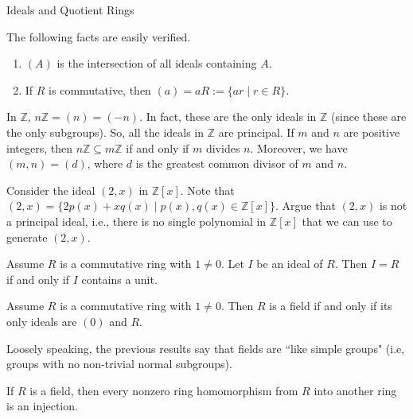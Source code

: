 \begin{section}{Ideals and Quotient Rings}
\begin{remark}
The following facts are easily verified.
\begin{enumerate}[label=\textrm{(\alph*)}]
\item $(A)$ is the intersection of all ideals containing $A$.
\item If $R$ is commutative, then $(a)=aR:=\{ar\mid r\in R\}$.
\end{enumerate}
\end{remark}

\begin{example}\label{ex:PrincipalIdeals}
In $\mathbb{Z}$, $n\mathbb{Z}=(n)=(-n)$.  In fact, these are the only ideals in $\mathbb{Z}$ (since these are the only subgroups). So, all the ideals in $\mathbb{Z}$ are principal. If $m$ and $n$ are positive integers, then $n\mathbb{Z}\subseteq m\mathbb{Z}$ if and only if $m$ divides $n$.  Moreover, we have $(m,n)=(d)$, where $d$ is the greatest common divisor of $m$ and $n$.
\end{example}

\begin{problem}
Consider the ideal $(2,x)$ in $\mathbb{Z}[x]$. Note that $(2,x)=\{2p(x)+xq(x)\mid p(x),q(x)\in\mathbb{Z}[x]\}$.  Argue that $(2,x)$ is not a principal ideal, i.e., there is no single polynomial in $\mathbb{Z}[x]$ that we can use to generate $(2,x)$.
\end{problem}

\begin{theorem}
Assume $R$ is a commutative ring with $1\neq 0$. Let $I$ be an ideal of $R$. Then $I=R$ if and only if $I$ contains a unit.
\end{theorem}

\begin{theorem}
Assume $R$ is a commutative ring with $1\neq 0$.  Then $R$ is a field if and only if its only ideals are $(0)$ and $R$.
\end{theorem}

Loosely speaking, the previous results say that fields are ``like simple groups" (i.e, groups with no non-trivial normal subgroups).

\begin{corollary}\label{cor:HomFromField}
If $R$ is a field, then every nonzero ring homomorphism from $R$ into another ring is an injection.
\end{corollary}

\end{section}

